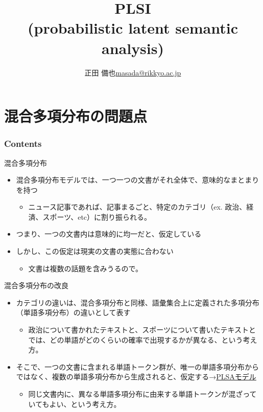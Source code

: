 \documentclass[aspectratio=169,unicode,dvipdfmx,14pt]{beamer}
\title{PLSI \\ (probabilistic latent semantic analysis)}
\author{\texorpdfstring{正田 備也\newline\href{mailto:masada@rikkyo.ac.jp}{masada@rikkyo.ac.jp}}{正田 備也}}
\date{}
\begin{document}
\begin{frame}
\titlepage
\end{frame}

\section{混合多項分布の問題点}

\begin{frame}\frametitle{Contents}
\Large \tableofcontents[currentsection]
\end{frame}

\begin{frame}{混合多項分布}
\begin{itemize}
\item 混合多項分布モデルでは、一つ一つの文書がそれ全体で、意味的なまとまりを持つ
\begin{itemize}
\item ニュース記事であれば、記事まるごと、特定のカテゴリ（ex. 政治、経済、スポーツ、etc）に割り振られる。
\end{itemize}
\item つまり、一つの文書内は意味的に均一だと、仮定している
\item しかし、この仮定は現実の文書の実態に合わない
\begin{itemize}
\item 文書は複数の話題を含みうるので。
\end{itemize}
\end{itemize}
\end{frame}

\begin{frame}{混合多項分布の改良}
\begin{itemize}
\item カテゴリの違いは、混合多項分布と同様、語彙集合上に定義された多項分布（単語多項分布）の違いとして表す
\begin{itemize}
\item 政治について書かれたテキストと、スポーツについて書いたテキストとでは、どの単語がどのくらいの確率で出現するかが異なる、という考え方。
\end{itemize}
\item そこで、一つの文書に含まれる単語トークン群が、唯一の単語多項分布からではなく、複数の単語多項分布から生成されると、仮定する→\underline{PLSAモデル}
\begin{itemize}
\item 同じ文書内に、異なる単語多項分布に由来する単語トークンが混ざっていてもよい、という考え方。
\end{itemize}
\end{itemize}
\end{frame}
\end{document}
